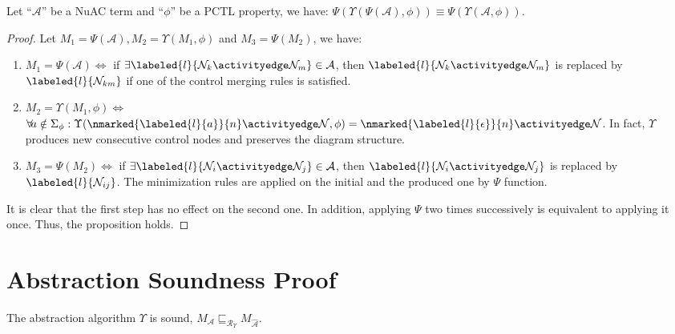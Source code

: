 \begin{proposition}
Let ``$\mathcal{A}$'' be a NuAC term and ``$\phi$'' be a PCTL property, we have:
$\Psi(\Upsilon(\Psi(\mathcal{A}),\phi))\equiv\Psi(\Upsilon(\mathcal{A},\phi))$.
\end{proposition}
\begin{proof}
Let $M_{1}=\Psi(\mathcal{A}), M_{2}=\Upsilon(M_{1},\phi)$ and $M_{3}=\Psi(M_{2})$, we have:
\begin{enumerate}
  \item $M_{1}=\Psi(\mathcal{A})\Leftrightarrow$ if $\exists \labeled{l}{\mathcal{N}_{k}\activityedge\mathcal{N}_{m}}\in\mathcal{A}$, then $\labeled{l}{\mathcal{N}_{k}\activityedge\mathcal{N}_{m}}$ is replaced by $\labeled{l}{\mathcal{N}_{km}}$ if one of the control merging rules is satisfied.
  \item $M_{2}=\Upsilon(M_{1},\phi)\Leftrightarrow$ $\forall\!a\notin\Sigma_\phi:\Upsilon(\nmarked{\labeled{l}{a}}{n}\activityedge\mathcal{N},\phi)=\nmarked{\labeled{l}{\epsilon}}{n}\activityedge\mathcal{N}$. In fact, $\Upsilon$ produces new consecutive control nodes and preserves the diagram structure.
  \item $M_{3}=\Psi(M_{2})\Leftrightarrow$ if $\exists \labeled{l}{\mathcal{N}_{i}\activityedge\mathcal{N}_{j}}\in\mathcal{A}$, then $\labeled{l}{\mathcal{N}_{i}\activityedge\mathcal{N}_{j}}$ is replaced by $\labeled{l}{\mathcal{N}_{ij}}$. The minimization rules are applied on the initial and the produced one by $\Psi$ function.
\end{enumerate}
It is clear that the first step has no effect on the second one. In addition, applying $\Psi$ two times successively is equivalent to applying it once. Thus, the proposition holds.
\end{proof}

\section{Abstraction Soundness Proof}\label{sub:Proofsound}
\setcounter{proposition}{3}
\setcounter{lemma}{0}

\begin{lemma}%
The abstraction algorithm $\Upsilon$ is sound, \ie $M_\mathcal{{A}}\sqsubseteq_{\mathscr{R}_\Upsilon}M_\mathcal{{\widehat{A}}}$.
\end{lemma}

